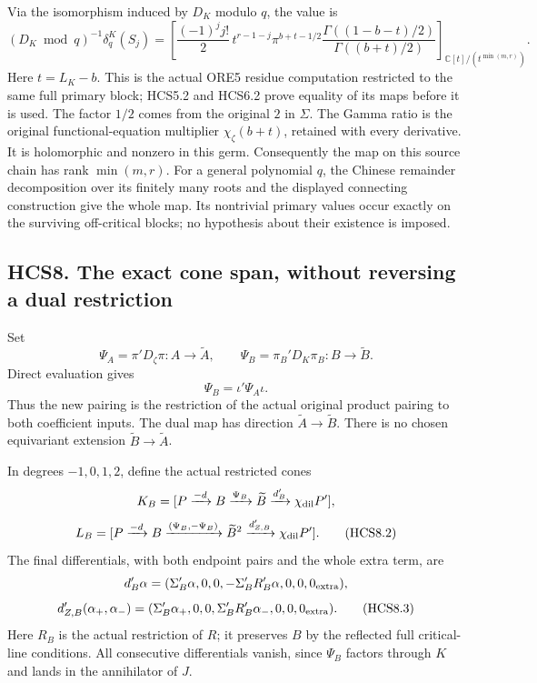 Via the isomorphism induced by \(D_K\) modulo \(q\), the value is \[
\boxed{
(D_K\bmod q)^{-1}\delta_q^K(S_j)=
\left[
\frac{(-1)^j j!}{2}\,t^{r-1-j}
\pi^{b+t-1/2}
\frac{\Gamma((1-b-t)/2)}{\Gamma((b+t)/2)}
\right]_{\mathbb C[t]/(t^{\min(m,r)})}.}
\tag{HCS7.10}
\] Here \(t=L_K-b\). This is the actual ORE5 residue computation
restricted to the same full primary block; HCS5.2 and HCS6.2 prove
equality of its maps before it is used. The factor \(1/2\) comes from
the original \(2\) in \(\Sigma\). The Gamma ratio is the original
functional-equation multiplier \(\chi_\zeta(b+t)\), retained with every
derivative. It is holomorphic and nonzero in this germ. Consequently the
map on this source chain has rank \(\min(m,r)\). For a general
polynomial \(q\), the Chinese remainder decomposition over its finitely
many roots and the displayed connecting construction give the whole map.
Its nontrivial primary values occur exactly on the surviving
off-critical blocks; no hypothesis about their existence is imposed.

\subsection{HCS8. The exact cone span, without reversing a dual
restriction}\label{hcs8.-the-exact-cone-span-without-reversing-a-dual-restriction}

Set \[
\Psi_A=\pi'D_\zeta\pi:A\to\widetilde A,\qquad
\Psi_B=\pi_B'D_K\pi_B:B\to\widetilde B.
\] Direct evaluation gives \[
\boxed{\Psi_B=\iota'\Psi_A\iota.}
\tag{HCS8.1}
\] Thus the new pairing is the restriction of the actual original
product pairing to both coefficient inputs. The dual map has direction
\(\widetilde A\to\widetilde B\). There is no chosen equivariant
extension \(\widetilde B\to\widetilde A\).

In degrees \(-1,0,1,2\), define the actual restricted cones \[
K_B=[P\xrightarrow{-d}B\xrightarrow{\Psi_B}
\widetilde B\xrightarrow{d_B'}\chi_{\rm dil}P'],
\] \[
L_B=[P\xrightarrow{-d}B\xrightarrow{(\Psi_B,-\Psi_B)}
\widetilde B^2\xrightarrow{d_{Z,B}'}\chi_{\rm dil}P'].
\tag{HCS8.2}
\] The final differentials, with both endpoint pairs and the whole extra
term, are \[
d_B'\alpha=(\Sigma_B'\alpha,0,0,
-\Sigma_B'R_B'\alpha,0,0,0_{\rm extra}),
\] \[
d_{Z,B}'(\alpha_+,\alpha_-)
=(\Sigma_B'\alpha_+,0,0,
\Sigma_B'R_B'\alpha_-,0,0,0_{\rm extra}).
\tag{HCS8.3}
\] Here \(R_B\) is the actual restriction of \(R\); it preserves \(B\)
by the reflected full critical-line conditions. All consecutive
differentials vanish, since \(\Psi_B\) factors through \(K\) and lands
in the annihilator of \(J\).

